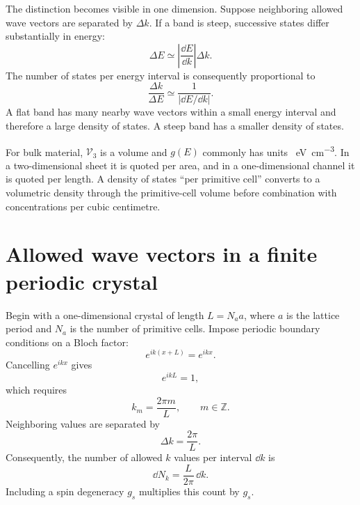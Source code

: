 The distinction becomes visible in one dimension.  Suppose neighboring allowed
wave vectors are separated by $\Delta k$.  If a band is steep, successive
states differ substantially in energy:
\begin{equation}
  \Delta E\simeq\left|\frac{\dd E}{\dd k}\right|\Delta k.
  \label{eq:energy-spacing-from-band-slope}
\end{equation}
The number of states per energy interval is consequently proportional to
\begin{equation}
  \frac{\Delta k}{\Delta E}
  \simeq\frac{1}{|\dd E/\dd k|}.
  \label{eq:one-dimensional-dos-slope-idea}
\end{equation}
A flat band has many nearby wave vectors within a small energy interval and
therefore a large density of states.  A steep band has a smaller density of
states.

For bulk material, $\mathcal V_3$ is a volume and $g(E)$ commonly has units
\si{\per\electronvolt\per\cubic\centi\metre}.  In a two-dimensional sheet it
is quoted per area, and in a one-dimensional channel it is quoted per length.
A density of states ``per primitive cell'' converts to a volumetric density
through the primitive-cell volume before combination with concentrations per
cubic centimetre.

\section{Allowed wave vectors in a finite periodic crystal}

Begin with a one-dimensional crystal of length $L=N_a a$, where $a$ is the
lattice period and $N_a$ is the number of primitive cells.  Impose periodic
boundary conditions on a Bloch factor:
\begin{equation}
  e^{ik(x+L)}=e^{ikx}.
  \label{eq:dos-periodic-boundary-condition}
\end{equation}
Cancelling $e^{ikx}$ gives
\begin{equation}
  e^{ikL}=1,
  \label{eq:dos-periodic-phase-condition}
\end{equation}
which requires
\begin{equation}
  k_m=\frac{2\pi m}{L},
  \qquad m\in\mathbb Z.
  \label{eq:dos-allowed-one-dimensional-k}
\end{equation}
Neighboring values are separated by
\begin{equation}
  \Delta k=\frac{2\pi}{L}.
  \label{eq:dos-one-dimensional-k-spacing}
\end{equation}
Consequently, the number of allowed $k$ values per interval $\dd k$ is
\begin{equation}
  \dd N_k=\frac{L}{2\pi}\,\dd k.
  \label{eq:dos-one-dimensional-k-count}
\end{equation}
Including a spin degeneracy $g_s$ multiplies this count by $g_s$.

